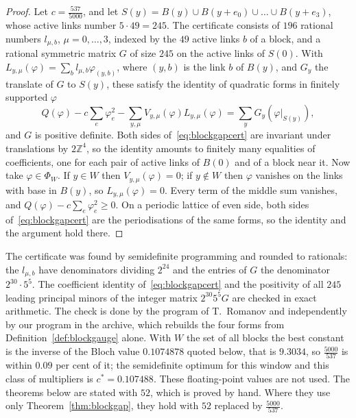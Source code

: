 \documentclass[11pt]{amsart}
\theoremstyle{definition}
\theoremstyle{remark}
\numberwithin{equation}{section}
\newcommand{\Z}{\mathbb{Z}}
\begin{document}
\begin{proof}
Let $c=\frac{537}{5000}$, and let $S(y)=B(y)\cup B(y+e_0)\cup\dots\cup
B(y+e_3)$, whose active links number $5\cdot49=245$. The certificate consists
of $196$ rational numbers $l_{\mu,b}$, $\mu=0,\dots,3$, indexed by the
$49$ active links $b$ of a block, and a rational symmetric matrix $G$ of
size $245$ on the active links of $S(0)$. With
$L_{y,\mu}(\varphi)=\sum_bl_{\mu,b}\varphi_{(y,b)}$, where $(y,b)$ is the
link $b$ of $B(y)$, and $G_y$ the translate of $G$ to $S(y)$, these satisfy
the identity of quadratic forms in finitely supported $\varphi$
\begin{equation}\label{eq:blockgapcert}
Q(\varphi)-c\sum_e\varphi_e^2-\sum_{y,\mu}V_{y,\mu}(\varphi)L_{y,\mu}
(\varphi)=\sum_yG_y(\varphi|_{S(y)}),
\end{equation}
and $G$ is positive definite. Both sides of~\eqref{eq:blockgapcert} are
invariant under translations by $2\Z^4$, so the identity amounts to finitely
many equalities of coefficients, one for each pair of active links of
$B(0)$ and of a block near it. Now take $\varphi\in\Phi_W$. If $y\in W$
then $V_{y,\mu}(\varphi)=0$; if $y\notin W$ then $\varphi$ vanishes on the
links with base in $B(y)$, so $L_{y,\mu}(\varphi)=0$. Every term of the
middle sum vanishes, and $Q(\varphi)-c\sum_e\varphi_e^2\ge0$. On a periodic
lattice of even side, both sides of~\eqref{eq:blockgapcert} are the
periodisations of the same forms, so the identity and the argument
hold there.
\end{proof}

The certificate was found by semidefinite programming and rounded to
rationals: the $l_{\mu,b}$ have denominators dividing $2^{24}$ and the
entries of $G$ the denominator $2^{30}\cdot5^5$. The coefficient identity
of~\eqref{eq:blockgapcert} and the positivity of all $245$ leading principal
minors of the integer matrix $2^{30}5^5G$ are checked in exact arithmetic. The check
is done by the program of T.~Romanov and independently by our program in
the archive, which rebuilds the four forms from
Definition~\ref{def:blockgauge} alone. With $W$ the set of all blocks the
best constant is the inverse of the Bloch value $0.1074878$ quoted below,
that is $9.3034$, so $\frac{5000}{537}$ is within $0.09$ per cent of it;
the semidefinite optimum for this window and this class of multipliers is
$c^*=0.107488$. These floating-point values are not used. The theorems below are stated with $52$, which
is proved by hand. Where they use only Theorem~\ref{thm:blockgap}, they hold
with $52$ replaced by $\frac{5000}{537}$.
\end{document}
